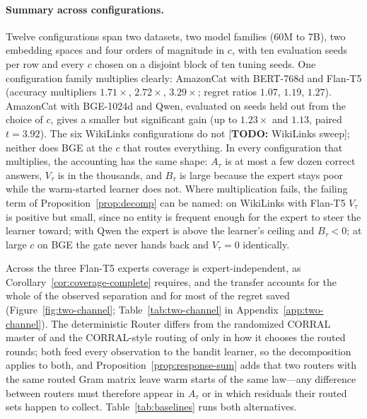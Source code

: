 \documentclass{article}
\theoremstyle{definition}
\theoremstyle{remark}
\theoremstyle{remark}
\newcommand{\todo}[1]{\textcolor{red!70!black}{[\textbf{TODO:} #1]}}
\begin{document}
\paragraph{Summary across configurations.}
Twelve configurations span two datasets, two model families (60M to 7B), two
embedding spaces and four orders of magnitude in $c$, with ten evaluation
seeds per row and every $c$ chosen on a disjoint block of ten tuning seeds. One configuration family
multiplies clearly: AmazonCat with BERT-768d and Flan-T5 (accuracy multipliers
$1.71\times$, $2.72\times$, $3.29\times$; regret ratios $1.07$, $1.19$,
$1.27$). AmazonCat with BGE-1024d and Qwen, evaluated on seeds held out from
the choice of $c$, gives a smaller but significant gain (up to $1.23\times$ and
$1.13$, paired $t=3.92$). The six WikiLinks configurations do not \todo{WikiLinks sweep};
neither does BGE at the $c$ that routes everything. In every configuration
that multiplies, the accounting has the same shape: $A_\tau$ is at most a few
dozen correct answers, $V_\tau$ is in the thousands, and $B_\tau$ is large because the expert stays poor while the
warm-started learner does not. Where multiplication fails, the failing term of
Proposition~\ref{prop:decomp} can be named: on WikiLinks with Flan-T5
$V_\tau$ is positive but small, since no entity is frequent enough for the
expert to steer the learner toward; with Qwen the expert is above the learner's ceiling and $B_\tau<0$;
at large $c$ on BGE the gate never hands back and $V_\tau=0$ identically.

Across the three Flan-T5 experts coverage is
expert-independent, as Corollary~\ref{cor:coverage-complete} requires, and the
transfer accounts for the whole of the observed separation and for most of the
regret saved (Figure~\ref{fig:two-channel}; Table~\ref{tab:two-channel} in
Appendix~\ref{app:two-channel}). The deterministic Router differs from the
randomized CORRAL master of \cite{agarwal2017corralling} and the CORRAL-style
routing of \cite{chen2024llmdecision} only in how it chooses the routed
rounds; both feed every observation to the bandit learner, so the
decomposition applies to both, and Proposition~\ref{prop:response-sum} adds
that two routers with the same routed Gram matrix leave warm starts of the
same law---any difference between routers must therefore appear in $A_\tau$ or
in which residuals their routed sets happen to collect.
Table~\ref{tab:baselines} runs both alternatives.
\end{document}
